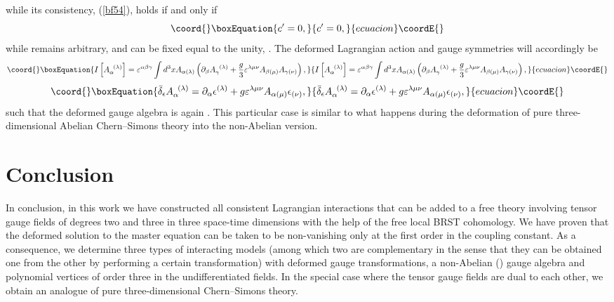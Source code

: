 \documentclass[a4paper,11pt]{article}
\begin{document}
while its consistency, (\ref{bf54}), holds if and only if
\begin{equation}\coord{}\boxEquation{
c^{\prime }=0,  \label{bf107}
}{
c^{\prime }=0,  }{ecuacion}\coordE{}\end{equation}
while \coordHE{} remains arbitrary, and can be fixed equal to the unity, \coordHE{}. The
deformed Lagrangian action and gauge symmetries will accordingly be
\begin{equation}\coord{}\boxEquation{
I\left[ A_{\alpha }^{\;\;(\lambda )}\right] =\varepsilon ^{\alpha \beta
\gamma }\int d^{3}xA_{\alpha (\lambda )}\left( \partial _{\beta }A_{\gamma
}^{\;\;(\lambda )}+\frac{g}{3}\varepsilon ^{\lambda \mu \nu }A_{\beta (\mu
)}A_{\gamma (\nu )}\right) ,  \label{bf108}
}{
I\left[ A_{\alpha }^{\;\;(\lambda )}\right] =\varepsilon ^{\alpha \beta
\gamma }\int d^{3}xA_{\alpha (\lambda )}\left( \partial _{\beta }A_{\gamma
}^{\;\;(\lambda )}+\frac{g}{3}\varepsilon ^{\lambda \mu \nu }A_{\beta (\mu
)}A_{\gamma (\nu )}\right) ,  }{ecuacion}\coordE{}\end{equation}
\begin{equation}\coord{}\boxEquation{
\bar{\delta}_{\epsilon }A_{\alpha }^{\;\;(\lambda )}=\partial _{\alpha
}\epsilon ^{(\lambda )}+g\varepsilon ^{\lambda \mu \nu }A_{\alpha (\mu
)}\epsilon _{(\nu )},  \label{bf109}
}{
\bar{\delta}_{\epsilon }A_{\alpha }^{\;\;(\lambda )}=\partial _{\alpha
}\epsilon ^{(\lambda )}+g\varepsilon ^{\lambda \mu \nu }A_{\alpha (\mu
)}\epsilon _{(\nu )},  }{ecuacion}\coordE{}\end{equation}
such that the deformed gauge algebra is again \coordHE{}. This particular case
is similar to what happens during the deformation of pure three-dimensional
Abelian Chern--Simons theory into the non-Abelian version.

\section{Conclusion}

In conclusion, in this work we have constructed all consistent Lagrangian
interactions that can be added to a free theory involving tensor gauge
fields of degrees two and three in three space-time dimensions with the help
of the free local BRST cohomology. We have proven that the deformed solution
to the master equation can be taken to be non-vanishing only at the first
order in the coupling constant. As a consequence, we determine three types
of interacting models (among which two are complementary in the sense that
they can be obtained one from the other by performing a certain
transformation) with deformed gauge transformations, a non-Abelian (\coordHE{})
gauge algebra and polynomial vertices of order three in the undifferentiated
fields. In the special case where the tensor gauge fields are dual to each
other, we obtain an analogue of pure three-dimensional Chern--Simons theory.
\end{document}
